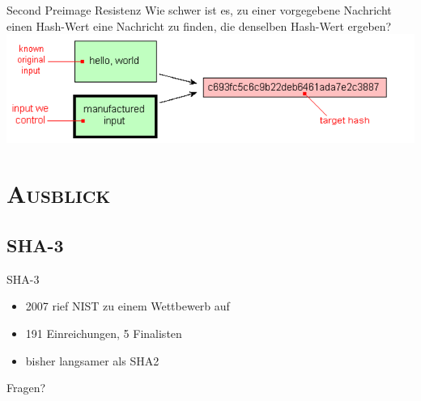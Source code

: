 \documentclass[xcolor=x11names,compress]{beamer}
\renewcommand{\(}{\begin{columns}}
\renewcommand{\)}{\end{columns}}
\newcommand{\<}[1]{\begin{column}{#1}}
\renewcommand{\>}{\end{column}}
\begin{document}
\begin{frame}{Second Preimage Resistenz}
Wie schwer ist es, zu einer vorgegebene Nachricht einen Hash-Wert eine Nachricht zu finden, die denselben Hash-Wert ergeben? \\
\includegraphics[scale=0.52]{2nd-preimage-resistance.png}
\end{frame}

\section{\scshape Ausblick}
\subsection{SHA-3}
\begin{frame}{SHA-3}
\begin{itemize}
	\item 2007 rief NIST zu einem Wettbewerb auf
\pause	
	\item 191 Einreichungen, 5 Finalisten
\pause
\item bisher langsamer als SHA2
\end{itemize}
 \end{frame}
 
 
\begin{frame}
\huge{Fragen?}
\end{frame}

\end{document}
